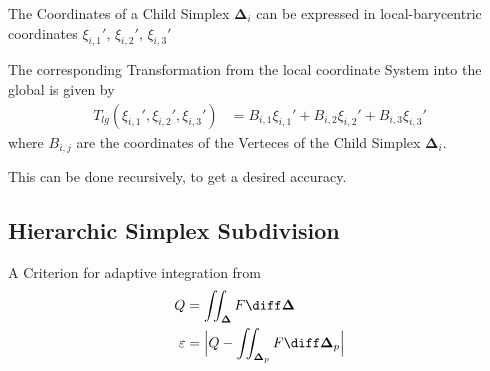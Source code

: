 \documentclass{mitschrift}
\newcommand{\simplex}{\boldsymbol{\Delta}}
\begin{document}
The Coordinates of a Child Simplex $\simplex_i$ can be expressed in local-barycentric coordinates $\xi_{i,1}',\, \xi_{i,2}',\, \xi_{i,3}'$

The corresponding Transformation from the local coordinate System into the global is given by \begin{align}
   T_{lg}(\xi_{i,1}', \xi_{i,2}', \xi_{i,3}') &= B_{i,1}\xi_{i,1}' + B_{i,2}\xi_{i,2}' + B_{i,3} \xi_{i,3}'
\end{align} where $B_{i,j}$ are the coordinates of the Verteces of the Child Simplex $\simplex_i$.

This can be done recursively, to get a desired accuracy.
%



\subsection{Hierarchic Simplex Subdivision}

A Criterion for adaptive integration from \cite{gonnetReviewErrorEstimation2012}\begin{align}
    Q &= \iint_{\simplex} F \diff \simplex \\
    \varepsilon &= \Bigl\vert Q - \iint_{\simplex_p} F \diff \simplex_p \Bigr\vert
\end{align}
\end{document}
